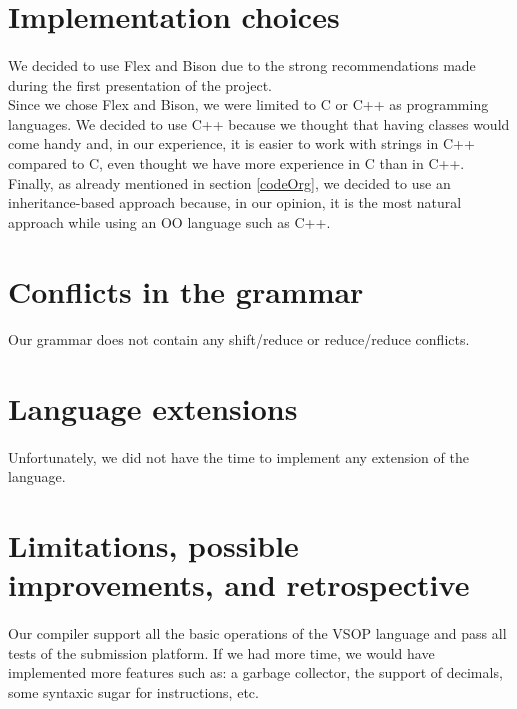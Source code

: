 \documentclass[a4paper, 11pt, oneside]{article}
\begin{document}
\section{Implementation choices}
\paragraph{}We decided to use Flex and Bison due to the strong recommendations made during the first presentation of the project.\\
Since we chose Flex and Bison, we were limited to C or C++ as programming languages. We decided to use C++ because we thought that having classes would come handy and, in our experience, it is easier to work with strings in C++ compared to C, even thought we have more experience in C than in C++.
Finally, as already mentioned in section \ref{codeOrg}, we decided to use an inheritance-based approach because, in our opinion, it is the most natural approach while using an OO language such as C++.


\section{Conflicts in the grammar}
\paragraph{}Our grammar does not contain any shift/reduce or reduce/reduce conflicts.


\section{Language extensions}
\paragraph{}Unfortunately, we did not have the time to implement any extension of the language.


\section{Limitations, possible improvements, and retrospective}
\paragraph{}Our compiler support all the basic operations of the VSOP language and pass all tests of the submission platform. If we had more time, we would have implemented more features such as: a garbage collector, the support of decimals, some syntaxic sugar for instructions, etc.
\end{document}
